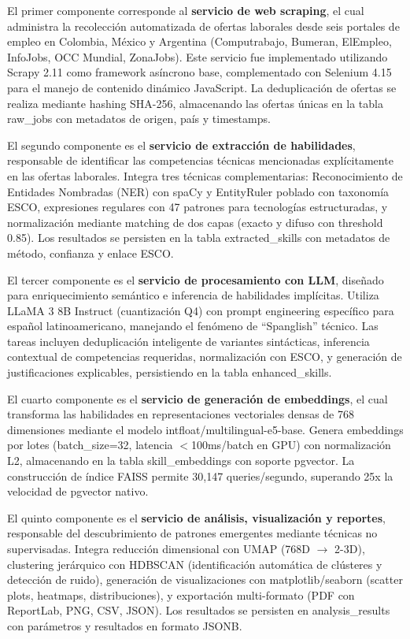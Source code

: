El primer componente corresponde al \textbf{servicio de web scraping}, el cual administra la recolección automatizada de ofertas laborales desde seis portales de empleo en Colombia, México y Argentina (Computrabajo, Bumeran, ElEmpleo, InfoJobs, OCC Mundial, ZonaJobs). Este servicio fue implementado utilizando Scrapy 2.11 como framework asíncrono base, complementado con Selenium 4.15 para el manejo de contenido dinámico JavaScript. La deduplicación de ofertas se realiza mediante hashing SHA-256, almacenando las ofertas únicas en la tabla raw\_jobs con metadatos de origen, país y timestamps.

El segundo componente es el \textbf{servicio de extracción de habilidades}, responsable de identificar las competencias técnicas mencionadas explícitamente en las ofertas laborales. Integra tres técnicas complementarias: Reconocimiento de Entidades Nombradas (NER) con spaCy y EntityRuler poblado con taxonomía ESCO, expresiones regulares con 47 patrones para tecnologías estructuradas, y normalización mediante matching de dos capas (exacto y difuso con threshold 0.85). Los resultados se persisten en la tabla extracted\_skills con metadatos de método, confianza y enlace ESCO.

El tercer componente es el \textbf{servicio de procesamiento con LLM}, diseñado para enriquecimiento semántico e inferencia de habilidades implícitas. Utiliza LLaMA 3 8B Instruct (cuantización Q4) con prompt engineering específico para español latinoamericano, manejando el fenómeno de ``Spanglish'' técnico. Las tareas incluyen deduplicación inteligente de variantes sintácticas, inferencia contextual de competencias requeridas, normalización con ESCO, y generación de justificaciones explicables, persistiendo en la tabla enhanced\_skills.

El cuarto componente es el \textbf{servicio de generación de embeddings}, el cual transforma las habilidades en representaciones vectoriales densas de 768 dimensiones mediante el modelo intfloat/multilingual-e5-base. Genera embeddings por lotes (batch\_size=32, latencia $<$100ms/batch en GPU) con normalización L2, almacenando en la tabla skill\_embeddings con soporte pgvector. La construcción de índice FAISS permite 30,147 queries/segundo, superando 25x la velocidad de pgvector nativo.

El quinto componente es el \textbf{servicio de análisis, visualización y reportes}, responsable del descubrimiento de patrones emergentes mediante técnicas no supervisadas. Integra reducción dimensional con UMAP (768D $\rightarrow$ 2-3D), clustering jerárquico con HDBSCAN (identificación automática de clústeres y detección de ruido), generación de visualizaciones con matplotlib/seaborn (scatter plots, heatmaps, distribuciones), y exportación multi-formato (PDF con ReportLab, PNG, CSV, JSON). Los resultados se persisten en analysis\_results con parámetros y resultados en formato JSONB.

